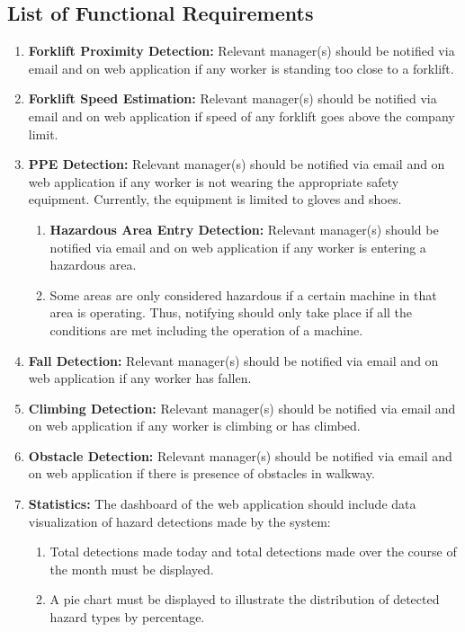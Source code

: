 \documentclass[12pt]{article}
\begin{document}
\subsection*{List of Functional Requirements}
\begin{enumerate}
    \item \textbf{Forklift Proximity Detection:} Relevant manager(s) should be notified via email and on web application if any worker is standing too close to a forklift.
    \item \textbf{Forklift Speed Estimation:} Relevant manager(s) should be notified via email and on web application if speed of any forklift goes above the company limit.
    \item \textbf{PPE Detection:} Relevant manager(s) should be notified via email and on web application if any worker is not wearing the appropriate safety equipment. Currently, the equipment is limited to gloves and shoes.
    \begin{enumerate}
        \item \textbf{Hazardous Area Entry Detection:} Relevant manager(s) should be notified via email and on web application if any worker is entering a hazardous area.
        \item Some areas are only considered hazardous if a certain machine in that area is operating. Thus, notifying should only take place if all the conditions are met including the operation of a machine.
    \end{enumerate}
    \item \textbf{Fall Detection:} Relevant manager(s) should be notified via email and on web application if any worker has fallen.
    \item \textbf{Climbing Detection:} Relevant manager(s) should be notified via email and on web application if any worker is climbing or has climbed.
    \item \textbf{Obstacle Detection:} Relevant manager(s) should be notified via email and on web application if there is presence of obstacles in walkway.
    \item \textbf{Statistics:} The dashboard of the web application should include data visualization of hazard detections made by the system:
    \begin{enumerate}
        \item Total detections made today and total detections made over the course of the month must be displayed.
        \item A pie chart must be displayed to illustrate the distribution of detected hazard types by percentage.

\end{enumerate}
\end{enumerate}
\end{document}
